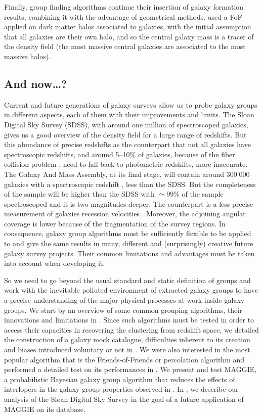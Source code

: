 Finally, group finding algorithms continue their insertion of galaxy formation
results, combining it with the advantage of geometrical methods.
\citet{MunozCuartas+12} used a FoF applied on dark matter halos associated to
galaxies, with the initial assumption that all galaxies are their own halo, and
so the central galaxy mass is a tracer of the density field (the most massive
central galaxies are associated to the most massive halos).

\subsection{And now\ldots?}
\label{sub:and_now}

Current and future generations of galaxy surveys allow us to probe galaxy
groups in different aspects, each of them with their improvements and limits.
The Sloan Digital Sky Survey (SDSS), with around one million of spectroscoped
galaxies, gives us a good overview of the density field for a large range of
redshifts. But this abundance of precise redshifts as the counterpart that not
all galaxies have spectroscopic redshifts, and around 5--10\% of galaxies,
because of the fiber collision problem \citep{Blanton+03}, need to fall back to
photometric redshifts, more inaccurate. The Galaxy And Mass Assembly, at its
final stage, will contain around $300\;000$ galaxies with a spectroscopic
redshift \citep{Hopkins+13}, less than the SDSS\@. But the completeness of the
sample will be higher than the SDSS with $\simeq99\%$ of the sample
spectroscoped and it is two magnitudes deeper. The counterpart is a less
precise measurement of galaxies recession velocities
\citep{Robotham+11,Hopkins+13}. Moreover, the adjoining angular coverage is
lower because of the fragmentation of the survey regions. In consequence,
galaxy group algorithms must be sufficiently flexible to be applied to and give
the same results in many, different and (surprisingly) creative future galaxy
survey projects. Their common limitations and advantages must be taken into
account when developing it.

So we need to go beyond the usual standard and static definition of groups and
work with the inevitable polluted environment of extracted galaxy groups to
have a precise understanding of the major physical processes at work inside
galaxy groups. We start by an overview of some common grouping algorithms,
their innovations and limitations in .
Since such algorithms must be tested in order to access their capacities in
recovering the clustering from redshift space, we detailed the construction of
a galaxy mock catalogue, difficulties inherent to its creation and biases
introduced voluntary or not in . We were also interested
in the most popular algorithm that is the Friends-of-Friends or percolation
algorithm and performed a detailed test on its performances in
. We present and test MAGGIE, a
probabilistic Bayesian galaxy group algorithm that reduces the effects of
interlopers in the galaxy group properties observed in .
In , we describe our analysis of the Sloan Digital Sky
Survey in the goal of a future application of MAGGIE on its database.

